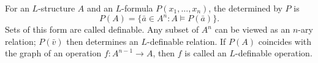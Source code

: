 For an $L$-structure $A$ and an $L$-formula $P(x_1, \ldots, x_n)$, the  determined by $P$ is
$$P(A) = \{ \bar{a} \in A^n : A \vDash P(\bar{a}) \}.$$
Sets of this form are called definable. Any subset of $A^n$ can be viewed as an $n$-ary relation; $P(\bar{v})$ then determines an $L$-definable relation. If $P(A)$ coincides with the graph of an operation $f : A^{n-1} \rightarrow A$, then $f$ is called an $L$-definable operation.
